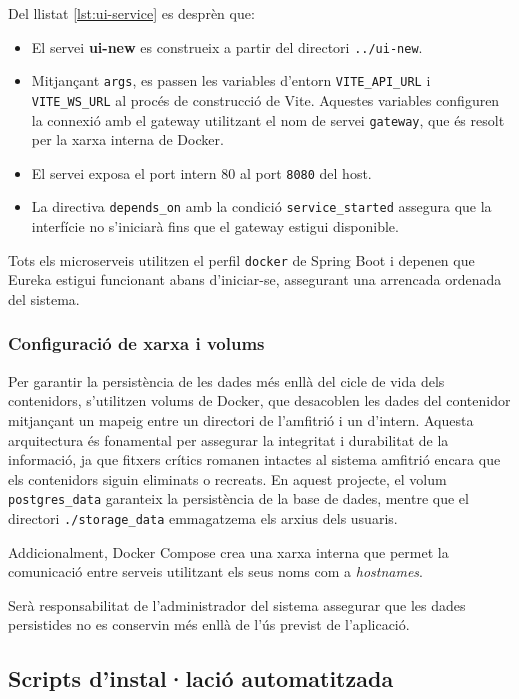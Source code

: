 Del llistat \ref{lst:ui-service} es desprèn que:
\begin{itemize}
  \item El servei \textbf{ui-new} es construeix a partir del directori \texttt{../ui-new}.
  \item Mitjançant \texttt{args}, es passen les variables d'entorn \texttt{VITE\_API\_URL} i \texttt{VITE\_WS\_URL} al procés de construcció de Vite. Aquestes variables configuren la connexió amb el gateway utilitzant el nom de servei \texttt{gateway}, que és resolt per la xarxa interna de Docker.
  \item El servei exposa el port intern 80 al port \texttt{8080} del host.
  \item La directiva \texttt{depends\_on} amb la condició \texttt{service\_started} assegura que la interfície no s'iniciarà fins que el gateway estigui disponible.
\end{itemize}


Tots els microserveis utilitzen el perfil \texttt{docker} de Spring Boot i depenen que Eureka estigui funcionant abans d'iniciar-se, assegurant una arrencada ordenada del sistema.

\subsubsection{Configuració de xarxa i volums}
Per garantir la persistència de les dades més enllà del cicle de vida dels contenidors, s'utilitzen volums de Docker, que desacoblen les dades del contenidor mitjançant un mapeig entre un directori de l'amfitrió i un d'intern. Aquesta arquitectura és fonamental per assegurar la integritat i durabilitat de la informació, ja que fitxers crítics romanen intactes al sistema amfitrió encara que els contenidors siguin eliminats o recreats. En aquest projecte, el volum \texttt{postgres\_data} garanteix la persistència de la base de dades, mentre que el directori \texttt{./storage\_data} emmagatzema els arxius dels usuaris.

Addicionalment, Docker Compose crea una xarxa interna que permet la comunicació entre serveis utilitzant els seus noms com a \textit{hostnames}. 

Serà responsabilitat de l'administrador del sistema assegurar que les dades persistides no es conservin més enllà de l'ús previst de l'aplicació.

\subsection{Scripts d'instal·lació automatitzada}


